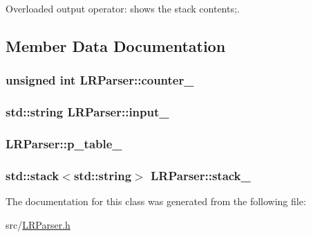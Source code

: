 \-Overloaded output operator\-: shows the stack contents;. 



\subsection{\-Member \-Data \-Documentation}
\hypertarget{classLRParser_acd3eab842429e90bd7dc0433274e0a37}{
\subsubsection[{counter\-\_\-}]{\setlength{\rightskip}{0pt plus 5cm}unsigned int {\bf \-L\-R\-Parser\-::counter\-\_\-}}}\label{d6/de9/classLRParser_acd3eab842429e90bd7dc0433274e0a37}
\hypertarget{classLRParser_a8dc38b1c7c3a3aa80abbd48ee2364319}{
\subsubsection[{input\-\_\-}]{\setlength{\rightskip}{0pt plus 5cm}std\-::string {\bf \-L\-R\-Parser\-::input\-\_\-}}}\label{d6/de9/classLRParser_a8dc38b1c7c3a3aa80abbd48ee2364319}
\hypertarget{classLRParser_a111f4dd04eb42896c7c31bd1a255a58b}{
\subsubsection[{p\-\_\-table\-\_\-}]{ {\bf \-L\-R\-Parser\-::p\-\_\-table\-\_\-}}}\label{d6/de9/classLRParser_a111f4dd04eb42896c7c31bd1a255a58b}
\hypertarget{classLRParser_a98af41152079cb4f2fe7f280629cf18c}{
\subsubsection[{stack\-\_\-}]{\setlength{\rightskip}{0pt plus 5cm}std\-::stack$<$std\-::string$>$ {\bf \-L\-R\-Parser\-::stack\-\_\-}}}\label{d6/de9/classLRParser_a98af41152079cb4f2fe7f280629cf18c}


\-The documentation for this class was generated from the following file\-:\begin{DoxyCompactItemize}
\item 
src/\hyperlink{LRParser_8h}{\-L\-R\-Parser.\-h}\end{DoxyCompactItemize}
